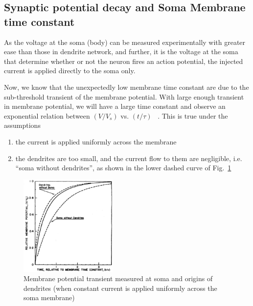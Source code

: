 \subsection[Decay and Time-constant]{Synaptic potential decay and Soma Membrane
time constant}
\label{sec:synapt-potent-decay}

As the voltage at the soma (body) can be measured experimentally with
greater ease than those in dendrite network, and further, it is the
voltage at the soma that determine whether or not the neuron fires an
action potential, the injected current is applied directly to the soma
only.


Now, we know that the unexpectedly low membrane time constant are due
to the sub-threshold transient of the membrane potential. With large
enough transient in membrane potential, we will have a large time
constant and observe an exponential relation between $(V/V_s)$
vs. $(t/\tau)$ ~\citep{rall1957mtc}. This is true under the assumptions
\begin{enumerate}
\item the current is applied uniformly across the membrane
\item the dendrites are too small, and the current flow to them are
  negligible, i.e. ``soma without dendrites'', as shown in the lower
  dashed curve of Fig.~\ref{fig:soma_potential}
\end{enumerate}


\begin{figure}[hbt]
  \centerline{\includegraphics[height=5cm,
    angle=0]{./images/potential_soma.eps}}
  \caption{Membrane potential transient measured at soma and origins
    of dendrites (when constant current is applied uniformly across
    the soma membrane)}
\label{fig:soma_potential}
\end{figure}


